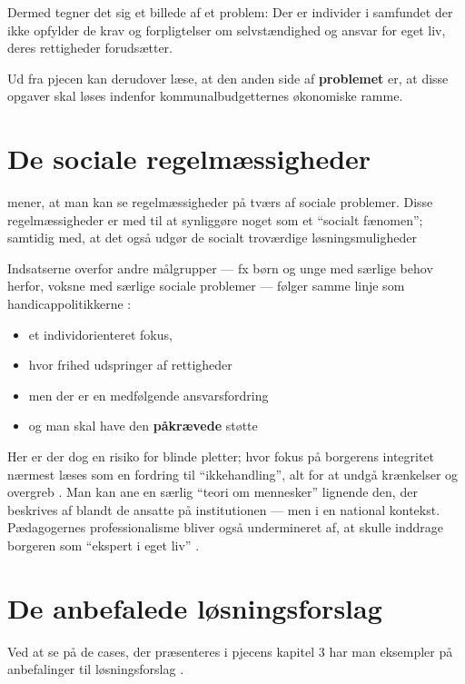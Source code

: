 Dermed tegner det sig et billede af et problem: Der er individer i samfundet der ikke opfylder de krav og forpligtelser om selvstændighed og ansvar for eget liv, deres rettigheder forudsætter.

Ud fra pjecen kan derudover læse, at den anden side af \textbf{problemet} er, at disse opgaver skal løses indenfor kommunalbudgetternes økonomiske ramme.

\section{De sociale regelmæssigheder}

\citeauthor{scheurichPolicyArchaeologyNew1994} mener, at man kan se regelmæssigheder på tværs af sociale problemer.
Disse regelmæssigheder er med til at synliggøre noget som et “socialt fænomen”; samtidig med, at det også udgør de socialt troværdige løsningsmuligheder \autocite[s. 301]{scheurichPolicyArchaeologyNew1994}

Indsatserne overfor andre målgrupper — fx børn og unge med særlige behov herfor, voksne med særlige sociale problemer — følger samme linje som handicappolitikkerne \autocite[Kap. 6, 15]{social-ogindenrigsministerietBekendtgorelseAfLov2019}:
\begin{itemize}
  \item
    et individorienteret fokus, 
  \item
    hvor frihed udspringer af rettigheder
  \item
    men der er en medfølgende ansvarsfordring
  \item
    og man skal have den \textbf{påkrævede} støtte
\end{itemize}

Her er der dog en risiko for blinde pletter; hvor fokus på borgerens integritet  nærmest læses som en fordring til “ikkehandling”, alt for at undgå krænkelser og overgreb \autocite{langagerDetAfmalteLiv2013}.
Man kan ane en særlig “teori om mennesker” lignende den, der beskrives af \citeauthor{goffmanAsylumsEssaysSocial1991} blandt de ansatte på institutionen — men i en national kontekst.
Pædagogernes professionalisme bliver også undermineret af, at skulle inddrage borgeren som “ekspert i eget liv” \autocite{mik-meyerIndledningSkabeProfessionel2012}.

\section{De anbefalede løsningsforslag}
Ved at se på de cases, der præsenteres i pjecens kapitel 3 har man eksempler på anbefalinger til løsningsforslag \autocite[ss. 18-40]{klStyringAfDet2017}.

